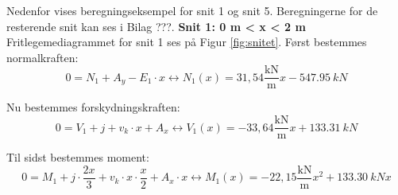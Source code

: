 Nedenfor vises beregningseksempel for snit 1 og snit 5. Beregningerne for de resterende snit kan ses i Bilag ???. 
\newline
\newline
\textbf{Snit 1: 0 m < x < 2 m}
\newline
Fritlegemediagrammet for snit 1 ses på Figur \ref{fig:snitet}.
\newline
\newline
Først bestemmes normalkraften:
\begin{equation}
	0 = N_1 + A_y - E_1 \cdot x \leftrightarrow N_1(x) = 31,\!54 \frac{\text{kN}}{\text{m}} x - \SI{547,95}{kN}
\end{equation}

Nu bestemmes forskydningskraften:
\begin{equation}
	0 = V_1 + j + v_k \cdot x + A_x \leftrightarrow V_1(x) = -33,\!64\frac{\text{kN}}{\text{m}} x + \SI{133,31}{kN}
\end{equation}

Til sidst bestemmes moment:
\begin{equation}
	0 = M_1 + j \cdot \frac{2x}{3} + v_k \cdot x \cdot \frac{x}{2} + A_x \cdot x \leftrightarrow M_1(x) = -22,\!15\frac{\text{kN}}{\text{m}} x^2 + \SI{133,30}{kN} x
\end{equation}


